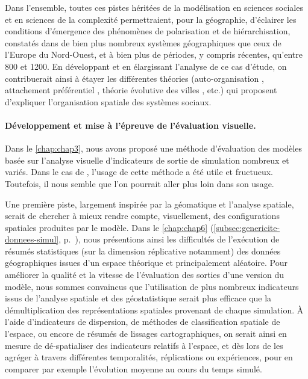 Dans l'ensemble, toutes ces pistes héritées de la modélisation en sciences sociales et en sciences de la complexité permettraient, pour la géographie, d'éclairer les conditions d'émergence des phénomènes de polarisation et de hiérarchisation, constatés dans de bien plus nombreux systèmes géographiques que ceux de l'Europe du Nord-Ouest, et à bien plus de périodes, y compris récentes, qu'entre 800 et 1200.
En développant et en élargissant l'analyse de ce cas d'étude, on contribuerait ainsi à étayer les différentes théories (auto-organisation \autocite{saint1989villes}, attachement préférentiel \autocite{albert_statistical_2002}, théorie évolutive des villes \autocite{pumain_pour_1997}, etc.) qui proposent d'expliquer l'organisation spatiale des systèmes sociaux.

\paragraph{Développement et mise à l'épreuve de l'évaluation visuelle.}
Dans le \cref{chap:chap3}, nous avons proposé une méthode d'évaluation des modèles basée sur l'analyse visuelle d'indicateurs de sortie de simulation nombreux et variés. Dans le cas de \simfeodal{}, l'usage de cette méthode a été utile et fructueux. Toutefois, il nous semble que l'on pourrait aller plus loin dans son usage.

Une première piste, largement inspirée par la géomatique et l'analyse spatiale, serait de chercher à mieux rendre compte, visuellement, des configurations spatiales produites par le modèle. Dans le \cref{chap:chap6} (\cref{subsec:genericite-donnees-simul}, p.~\pageref{par:specificites-donnees-simul}), nous présentions ainsi les difficultés de l'exécution de \og résumés statistiques\fg{} (sur la dimension réplicative notamment) des données géographiques issues d'un espace théorique et principalement aléatoire. Pour améliorer la qualité et la vitesse de l'évaluation des sorties d'une version du modèle, nous sommes convaincus que l'utilisation de plus nombreux indicateurs issus de l'analyse spatiale et des géostatistique serait plus efficace que la démultiplication des représentations spatiales provenant de chaque simulation. À l'aide d'indicateurs de dispersion, de méthodes de classification spatiale de l'espace, ou encore de résumés de lissages cartographiques, on serait ainsi en mesure de \og dé-spatialiser\fg{} des indicateurs relatifs à l'espace, et dès lors de les agréger à travers différentes temporalités, réplications ou expériences, pour en comparer par exemple l'évolution moyenne au cours du temps simulé.

